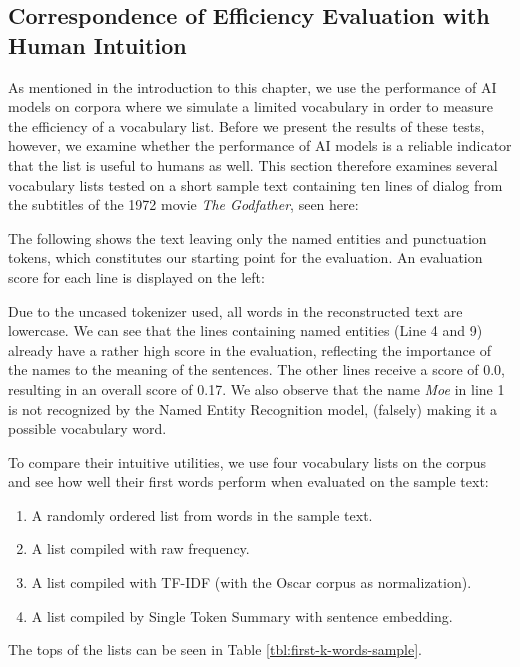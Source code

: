 \subsection{Correspondence of Efficiency Evaluation with Human Intuition} \label{sec:does-eval-correpond-to-intuition}
As mentioned in the introduction to this chapter, we use the performance of AI models on corpora where we simulate a limited vocabulary in order to measure the efficiency of a vocabulary list.
Before we present the results of these tests, however, we examine whether the performance of AI models is a reliable indicator that the list is useful to humans as well.
This section therefore examines several vocabulary lists tested on a short sample text containing ten lines of dialog from the subtitles of the 1972 movie \textit{The Godfather}, seen here:



The following shows the text leaving only the named entities and punctuation tokens, which constitutes our starting point for the evaluation.
An evaluation score for each line is displayed on the left:



Due to the uncased tokenizer used, all words in the reconstructed text are lowercase.
We can see that the lines containing named entities (Line 4 and 9) already have a rather high score in the evaluation, reflecting the importance of the names to the meaning of the sentences.
The other lines receive a score of 0.0, resulting in an overall score of 0.17.
We also observe that the name \textit{Moe} in line 1 is not recognized by the Named Entity Recognition model, (falsely) making it a possible vocabulary word.

To compare their intuitive utilities, we use four vocabulary lists on the corpus and see how well their first words perform when evaluated on the sample text:
\begin{enumerate}
	\item A randomly ordered list from words in the sample text.
	\item A list compiled with raw frequency.
	\item A list compiled with TF-IDF (with the Oscar corpus as normalization).
	\item A list compiled by Single Token Summary with sentence embedding.
\end{enumerate}

The tops of the lists can be seen in Table \ref{tbl:first-k-words-sample}.

